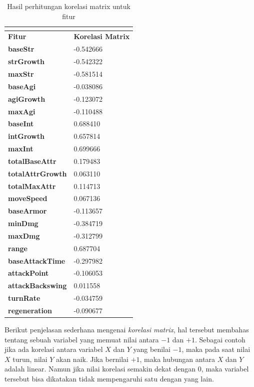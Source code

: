 \begin{longtable}{|l|l|}
	\caption{Hasil perhitungan korelasi matrix untuk fitur}
	\vspace{1ex}
	\label{tb:dota2_matrix_corel}\\
	\hline
	\rowcolor[HTML]{C0C0C0} 
	\textbf{Fitur} & \textbf{Korelasi Matrix} \\ \hline
	\textbf{baseStr} & -0.542666 \\ \hline
	\textbf{strGrowth} & -0.542322 \\ \hline
	\textbf{maxStr} & -0.581514 \\ \hline
	\textbf{baseAgi} & -0.038086 \\ \hline
	\textbf{agiGrowth} & -0.123072 \\ \hline
	\textbf{maxAgi} & -0.110488 \\ \hline
	\textbf{baseInt} & 0.688410 \\ \hline
	\textbf{intGrowth} & 0.657814 \\ \hline
	\textbf{maxInt} & 0.699666 \\ \hline
	\textbf{totalBaseAttr} & 0.179483 \\ \hline
	\textbf{totalAttrGrowth} & 0.063110 \\ \hline
	\textbf{totalMaxAttr} & 0.114713 \\ \hline
	\textbf{moveSpeed} & 0.067136 \\ \hline
	\textbf{baseArmor} & -0.113657 \\ \hline
	\textbf{minDmg} & -0.384719 \\ \hline
	\textbf{maxDmg} & -0.312799 \\ \hline
	\textbf{range} & 0.687704 \\ \hline
	\textbf{baseAttackTime} & -0.297982 \\ \hline
	\textbf{attackPoint} & -0.106053 \\ \hline
	\textbf{attackBackswing} & 0.011558 \\ \hline
	\textbf{turnRate} & -0.034759 \\ \hline
	\textbf{regeneration} & -0.090677 \\ \hline
\end{longtable}
\vspace{1ex}

Berikut penjelasan sederhana mengenai \textit{korelasi matrix}, hal tersebut membahas tentang sebuah variabel yang memuat nilai antara $-1$ dan $+1$. Sebagai contoh jika ada korelasi antara variabel $X$ dan $Y$ yang benilai $-1$, maka pada saat nilai $X$ turun, nilai $Y$ akan naik. Jika bernilai $+1$, maka hubungan antara $X$ dan $Y$ adalah linear. Namun jika nilai korelasi semakin dekat dengan $0$, maka variabel tersebut bisa dikatakan tidak mempengaruhi satu dengan yang lain.
\vspace{1ex}

